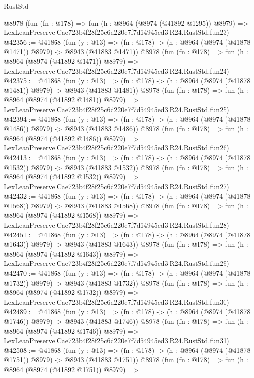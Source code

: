 \begin{lexlean}{RustStd}
\begin{coremodule}
    @8978
    (fun (fn : @178) =>
    fun (h : @8964 (@8974 (@41892 @1295)) @8979) =>
    LexLeanPreserve.Cae723b4f28f25c6d220e7f7d64945ed3.R24.RustStd.fun23)
@42356 := @41868
    (fun (y : @13) =>
    (fn : @178) -> (h : @8964 (@8974 (@41878 @1471)) @8979) -> @8943 (@41883 @1471))
    @8978
    (fun (fn : @178) =>
    fun (h : @8964 (@8974 (@41892 @1471)) @8979) =>
    LexLeanPreserve.Cae723b4f28f25c6d220e7f7d64945ed3.R24.RustStd.fun24)
@42375 := @41868
    (fun (y : @13) =>
    (fn : @178) -> (h : @8964 (@8974 (@41878 @1481)) @8979) -> @8943 (@41883 @1481))
    @8978
    (fun (fn : @178) =>
    fun (h : @8964 (@8974 (@41892 @1481)) @8979) =>
    LexLeanPreserve.Cae723b4f28f25c6d220e7f7d64945ed3.R24.RustStd.fun25)
@42394 := @41868
    (fun (y : @13) =>
    (fn : @178) -> (h : @8964 (@8974 (@41878 @1486)) @8979) -> @8943 (@41883 @1486))
    @8978
    (fun (fn : @178) =>
    fun (h : @8964 (@8974 (@41892 @1486)) @8979) =>
    LexLeanPreserve.Cae723b4f28f25c6d220e7f7d64945ed3.R24.RustStd.fun26)
@42413 := @41868
    (fun (y : @13) =>
    (fn : @178) -> (h : @8964 (@8974 (@41878 @1532)) @8979) -> @8943 (@41883 @1532))
    @8978
    (fun (fn : @178) =>
    fun (h : @8964 (@8974 (@41892 @1532)) @8979) =>
    LexLeanPreserve.Cae723b4f28f25c6d220e7f7d64945ed3.R24.RustStd.fun27)
@42432 := @41868
    (fun (y : @13) =>
    (fn : @178) -> (h : @8964 (@8974 (@41878 @1568)) @8979) -> @8943 (@41883 @1568))
    @8978
    (fun (fn : @178) =>
    fun (h : @8964 (@8974 (@41892 @1568)) @8979) =>
    LexLeanPreserve.Cae723b4f28f25c6d220e7f7d64945ed3.R24.RustStd.fun28)
@42451 := @41868
    (fun (y : @13) =>
    (fn : @178) -> (h : @8964 (@8974 (@41878 @1643)) @8979) -> @8943 (@41883 @1643))
    @8978
    (fun (fn : @178) =>
    fun (h : @8964 (@8974 (@41892 @1643)) @8979) =>
    LexLeanPreserve.Cae723b4f28f25c6d220e7f7d64945ed3.R24.RustStd.fun29)
@42470 := @41868
    (fun (y : @13) =>
    (fn : @178) -> (h : @8964 (@8974 (@41878 @1732)) @8979) -> @8943 (@41883 @1732))
    @8978
    (fun (fn : @178) =>
    fun (h : @8964 (@8974 (@41892 @1732)) @8979) =>
    LexLeanPreserve.Cae723b4f28f25c6d220e7f7d64945ed3.R24.RustStd.fun30)
@42489 := @41868
    (fun (y : @13) =>
    (fn : @178) -> (h : @8964 (@8974 (@41878 @1746)) @8979) -> @8943 (@41883 @1746))
    @8978
    (fun (fn : @178) =>
    fun (h : @8964 (@8974 (@41892 @1746)) @8979) =>
    LexLeanPreserve.Cae723b4f28f25c6d220e7f7d64945ed3.R24.RustStd.fun31)
@42508 := @41868
    (fun (y : @13) =>
    (fn : @178) -> (h : @8964 (@8974 (@41878 @1751)) @8979) -> @8943 (@41883 @1751))
    @8978
    (fun (fn : @178) =>
    fun (h : @8964 (@8974 (@41892 @1751)) @8979) =>

\end{coremodule}
\end{lexlean}
